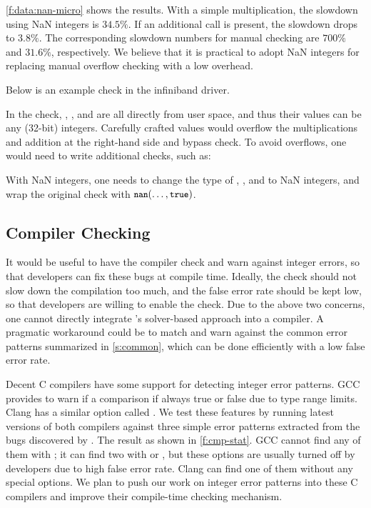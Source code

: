 \autoref{f:data:nan-micro} shows the results.
%
With a simple multiplication, the slowdown using NaN integers is
$34.5\%$.  If an additional  call is present, the slowdown
drops to $3.8\%$.
%
The corresponding slowdown numbers for manual checking
are $700\%$ and $31.6\%$, respectively.
%
We believe that it is practical to adopt NaN integers for
replacing manual overflow checking with a low overhead.

Below is an example check in the infiniband driver.

In the check, , , and  are
all directly from user space, and thus their values can be any
(32-bit) integers.  Carefully crafted values would overflow the
multiplications and addition at the right-hand side and bypass
check.  To avoid overflows, one would need to write additional
checks, such as:

With NaN integers, one needs to change the type of
, , and  to NaN integers,
and wrap the original check with $\cc{nan}(\dots, \cc{true})$.

\fi


\subsection{Compiler Checking}

It would be useful to have the compiler check and warn against
integer errors, so that developers can fix these bugs
at compile time.  Ideally, the check should not slow down
the compilation too much, and the false error rate should be kept low,
so that developers are willing to enable the check.
%
Due to the above two concerns, one cannot directly integrate
\sys's solver-based approach into a compiler.  A pragmatic workaround
could be to match and warn against the common error patterns
summarized in \autoref{s:common}, which can be done efficiently
with a low false error rate.

Decent C compilers have some support for detecting integer error
patterns.
%
GCC provides  to warn if a comparison if always
true or false due to type range limits.
%
Clang has a similar option called .
%
We test these features by running latest versions of both compilers
against three simple error patterns extracted from the bugs discovered
by \sys.  The result as shown in \autoref{f:cmp-stat}.  GCC cannot
find any of them with ; it can find two with 
or , but these options are usually turned off by
developers due to high false error rate.  Clang can find one of them
without any special options.
%
%
We plan to push our work on integer error patterns into these C
compilers and improve their compile-time checking mechanism.

